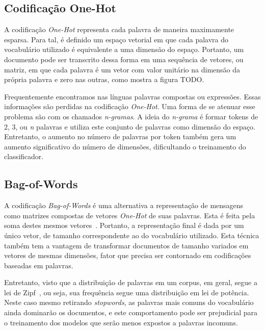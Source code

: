 \subsection{Codificação One-Hot}

A codificação \textit{One-Hot} representa cada palavra de maneira maximamente
esparsa.
Para tal, é definido um espaço vetorial em que cada palavra do vocabulário
utilizado é equivalente a uma dimensão do espaço.
Portanto, um documento pode ser transcrito dessa forma em uma sequência de
vetores, ou matriz, em que cada palavra é um vetor com valor unitário na
dimensão da própria palavra e zero nas outras, como mostra a figura TODO.


Frequentemente encontramos nas línguas palavras compostas ou expressões.
Essas informações são perdidas na codificação \textit{One-Hot}.
Uma forma de se atenuar esse problema são com os chamados \textit{n-gramas}.
A ideia do \textit{n-grama} é formar tokens de 2, 3, ou \textit{n} palavras e
utiliza este conjunto de palavras como dimensão do espaço.
Entretanto, o aumento no número de palavras por token também gera um aumento
significativo do número de dimensões, dificultando o treinamento do
classificador.

\subsection{Bag-of-Words}

A codificação \textit{Bag-of-Words} é uma alternativa a representação de
mensagens como matrizes compostas de vetores \textit{One-Hot} de suas palavras.
Esta é feita pela soma destes mesmos vetores~\cite{manning10}.
Portanto, a representação final é dada por um único vetor, de tamanho
correspondente ao do vocabulário utilizado.
Esta técnica também tem a vantagem de transformar documentos de tamanho variados
em vetores de mesmas dimensões, fator que precisa ser contornado em codificações
baseadas em palavras.


Entretanto, visto que a distribuição de palavras em um corpus, em geral, segue a
lei de Zipf~\cite{powers98}, ou seja, sua frequência segue uma distribuição em
lei de potência.
Neste caso mesmo retirando \textit{stopwords}, as palavras mais comuns do
vocabulário ainda dominarão os documentos, e este comportamento pode ser
prejudicial para o treinamento dos modelos que serão menos expostos a palavras
incomuns.

